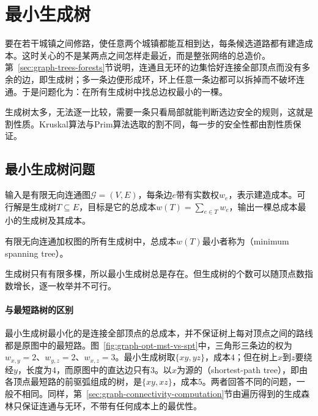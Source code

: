 
\section{最小生成树}
\label{sec:graph-minimum-spanning-tree}

要在若干城镇之间修路，使任意两个城镇都能互相到达，每条候选道路都有建造成本。这时关心的不是某两点之间怎样走最近，而是整张网络的总造价。第~\ref{sec:graph-trees-forests}节说明，连通且无环的边集恰好连接全部顶点而没有多余的边，即生成树；多一条边便形成环，环上任意一条边都可以拆掉而不破坏连通。于是问题化为：在所有生成树中找总边权最小的一棵。

生成树太多，无法逐一比较，需要一条只看局部就能判断选边安全的规则，这就是割性质。Kruskal算法与Prim算法选取的割不同，每一步的安全性都由割性质保证。

\subsection{最小生成树问题}
\label{sec:graph-opt-mst-problem}

输入是有限无向连通图$\mathcal G=(V,E)$，每条边$e$带有实数权$w_e$，表示建造成本。可行解是生成树$T\subseteq E$，目标是它的总成本$w(T)=\sum_{e\in T}w_e$，输出一棵总成本最小的生成树及其成本。

\begin{definition}[最小生成树]
\label{def:graph-opt-mst}
有限无向连通加权图的所有生成树中，总成本$w(T)$最小者称为（minimum spanning tree）。
\end{definition}

生成树只有有限多棵，所以最小生成树总是存在。但生成树的个数可以随顶点数指数增长，逐一枚举并不可行。

\paragraph{与最短路树的区别}
最小生成树最小化的是连接全部顶点的总成本，并不保证树上每对顶点之间的路线都是原图中的最短路。图~\ref{fig:graph-opt-mst-vs-spt}中，三角形三条边的权为$w_{x,y}=2$、$w_{y,z}=2$、$w_{x,z}=3$。最小生成树取$\{xy,yz\}$，成本$4$；但在树上$x$到$z$要绕经$y$，长度为$4$，而原图中的直达边只有$3$。以$x$为源的（shortest-path tree），即由各顶点最短路的前驱弧组成的树，是$\{xy,xz\}$，成本$5$。两者回答不同的问题，一般不相同。同样，第~\ref{sec:graph-connectivity-computation}节由遍历得到的生成森林只保证连通与无环，不带有任何成本上的最优性。

